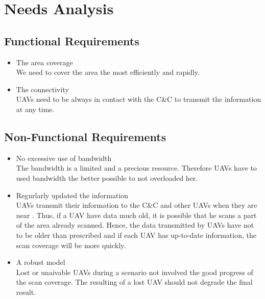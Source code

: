 \chapter{Needs Analysis}

\section{Functional Requirements}

\begin{itemize}

\item The area coverage\\
We need to cover the area the most efficiently and rapidly.

\item The connectivity\\
UAVs need to be always in contact with the C\&C to transmit the information at any time.

\end{itemize}

\section{Non-Functional Requirements}

\begin{itemize}

\item No excessive use of bandwidth\\
The bandwidth is a limited and a precious resource. Therefore UAVs have to used bandwidth the better possible to not overloaded her.

\item Regurlarly updated the information\\
UAVs transmit their information to the C\&C and other UAVs when they are near . Thus, if a UAV have data much old, it is possible that he scans a part of the area already scanned. Hence, the data transmitted by UAVs have not to be older than prescribed and if each UAV has up-to-date information, the scan coverage will be more quickly.

\item A robust model\\
Lost or unaivable UAVs during a scenario not involved the good progress of the scan coverage. The resulting of a lost UAV should not degrade the final result.

\end{itemize}
